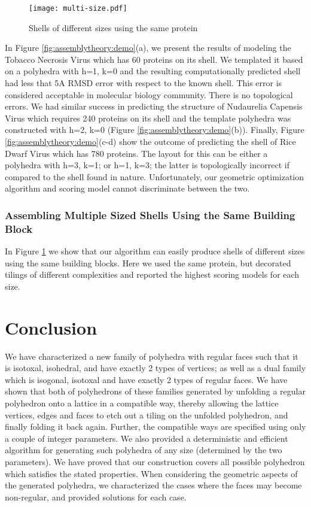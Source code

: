 \documentclass[11pt]{article}
\newcommand{\1}{\mathds{1}}
\begin{document}
\begin{figure}[t!]
\centering
 \texttt{[image: multi-size.pdf]}
\caption[Shells of different sizes using the same protein] {Shells of different sizes using the same protein}
\label{fig:virus:sizes}
\end{figure}

In Figure \ref{fig:assemblytheory:demo}(a), we present the results of modeling the Tobacco Necrosis Virus which has 60 proteins on its shell. We templated it based on a polyhedra with h=1, k=0 and the resulting computationally predicted shell had less that 5A RMSD error with respect to the known shell. This error is considered acceptable in molecular biology community. There is no topological errors. We had similar success in predicting the structure of Nudaurelia Capensis Virus which requires 240 proteins on its shell and the template polyhedra was constructed with h=2, k=0 (Figure \ref{fig:assemblytheory:demo}(b)). Finally, Figure \ref{fig:assemblytheory:demo}(c-d) show the outcome of predicting the shell of Rice Dwarf Virus which has 780 proteins. The layout for this can be either a polyhedra with h=3, k=1; or h=1, k=3; the latter is topologically incorrect if compared to the shell found in nature. Unfortunately, our geometric optimization algorithm and scoring model cannot discriminate between the two.


\subsubsection{Assembling Multiple Sized Shells Using the Same Building Block}

In Figure \ref{fig:virus:sizes} we show that our algorithm can easily produce shells of different sizes using the same building blocks. Here we used the same protein, but decorated tilings of different complexities and reported the highest scoring models for each size.



\section{Conclusion}
\label{sec:assemblytheory:conclusion}
We have characterized a new family of polyhedra with regular faces such that it is isotoxal, isohedral, and have exactly 2 types of vertices; as well as a dual family which is isogonal, isotoxal and have exactly 2 types of regular faces. We have shown that both of polyhedrons of these families generated by unfolding a regular polyhedron onto a lattice in a compatible way, thereby allowing the lattice vertices, edges and faces to etch out a tiling on the unfolded polyhedron, and finally folding it back again. Further, the compatible ways are specified using only a couple of integer parameters. We also provided a deterministic and efficient algorithm for generating such polyhedra of any size (determined by the two parameters). We have proved that our construction covers all possible polyhedron which satisfies the stated properties. When considering the geometric aspects of the generated polyhedra, we characterized the cases where the faces may become non-regular, and provided solutions for each case. 
\end{document}
